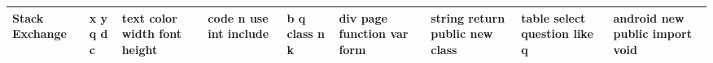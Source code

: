 \documentclass[11pt,a4paper]{article}
\begin{document}
\begin{appendices}
\begin{table*}[htb]
\begin{tiny}
\begin{tabular}{|p{}|p{}|p{}|p{}|p{}|p{}|p{}|p{}|p{}|}
    Stack Exchange & x \newline y \newline q \newline d \newline c & text \newline color \newline width \newline font \newline height & code \newline n \newline use \newline int \newline include & b \newline q \newline class \newline n \newline k & div \newline page \newline function \newline var \newline form & string \newline return \newline public \newline new \newline class & table \newline select \newline question \newline like \newline q & android \newline new \newline public \newline import \newline void\\\hline

\end{tabular}
\end{tiny}
\end{table*}
\end{appendices}
\end{document}
